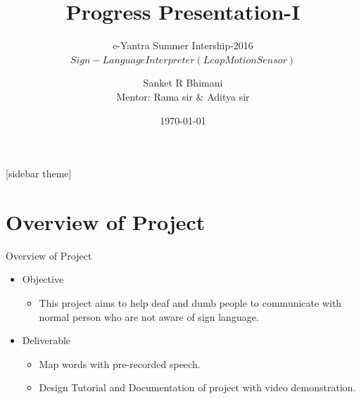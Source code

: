 \documentclass[10pt, a4paper]{beamer}
\begin{document}
	\title{Progress Presentation-I}
	\subtitle{e-Yantra Summer Intership-2016 \\ $Sign-Language Interpreter (Leap Motion Sensor)$}
	\author{Sanket R Bhimani\\
	Mentor: Rama sir \& Aditya sir}
	\date{\today}
	\frame{\titlepage}

[sidebar theme]
\section{Overview of Project}
\begin{frame}{Overview of Project}
\vspace{-45px}
\vspace{15px}
	\begin{itemize}
		\item Objective
		\begin{itemize}
		    \item This project aims to help deaf and dumb people to communicate with normal person who are not aware of sign language.
		\end{itemize}
		\item Deliverable
		\begin{itemize}
		    \item Map words with pre-recorded speech.
		    \item Design Tutorial and Documentation of project with video demonstration.
		\end{itemize}
	\end{itemize}
\end{frame}
\end{document}
